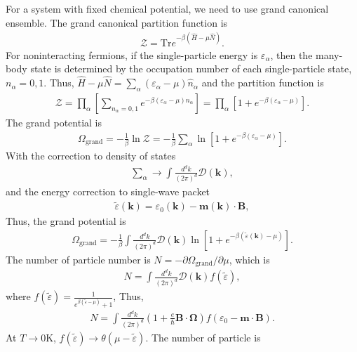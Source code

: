 \documentclass[12pt, oneside]{article}
\newcommand{\pa}{\partial}
\newcommand{\mr}[1]{\mathrm{#1}}
\newcommand{\p}[1]{\left(#1\right)}
\newcommand{\bb}[1]{\left[#1\right]}
\numberwithin{equation}{subsection}
\begin{document}
For a system with fixed chemical potential, we need to use grand canonical ensemble. The grand canonical partition function is 
\begin{align}
	\mathcal{Z} = \mr{Tr} e^{-\beta \p{\hat{H} - \mu \hat{N}}}.
\end{align}
For noninteracting fermions, if the single-particle energy is \(\varepsilon_\alpha\), then the many-body state is determined by the occupation number of each single-particle state, \(n_{\alpha} = 0,1\). Thus, \(\hat H-\mu \hat N = \sum_\alpha \p{\varepsilon_\alpha-\mu} \hat n_\alpha \) and the partition function is 
\begin{align}
	\mathcal Z = \prod_\alpha \left[ \sum_{n_\alpha=0,1} e^{-\beta(\varepsilon_\alpha-\mu)n_\alpha} \right] = \prod_{\alpha} \bb{1 + e^{-\beta \p{\varepsilon_{\alpha} - \mu}}}.
\end{align}
The grand potential is 
\begin{align}
	\Omega_\mr{grand} = - \frac{1}{\beta} \ln \mathcal{Z} =  - \frac{1}{\beta} \sum_{\alpha} \ln \bb{1 + e^{-\beta \p{\varepsilon_{\alpha} - \mu}}}.
\end{align}
With the correction to density of states 
\begin{align}
	\sum_{\alpha} \rightarrow \int \frac{d^d k}{\p{2 \pi}^{d}} \mathcal{D} \p{\bm{k}},
\end{align}
and the energy correction to single-wave packet
\begin{align}
	\tilde{\varepsilon} \p{\bm{k}} = \varepsilon_{0} \p{\bm{k} } - \bm{m} \p{\bm{k}} \cdot \bm{B},
\end{align}
Thus, the grand potential is 
\begin{align}
	\Omega_{\mr{grand}} =  -\frac{1}{\beta} \int \frac{d^d k}{\p{2 \pi}^{d}} \mathcal{D} \p{\bm{k}} \ln \left[ 1+ e^{-\beta(\tilde{\varepsilon}(\bm k)-\mu)} \right].
\end{align}
The number of particle number is \(N = - \pa \Omega_{\mr{grand}}/\pa \mu\), which is 
\begin{align}
	N = \int \frac{d^d k}{\p{2 \pi}^{d}} \mathcal{D}\p{\bm{k}}  f\p{\tilde{\varepsilon}},
\end{align}
where \(f \p{\tilde{\varepsilon}} = \frac{1}{e^{\beta \p{\tilde{\varepsilon}-\mu}}+1}\), Thus, 
\begin{align}
	N = \int \frac{d^d k}{\p{2 \pi}^{d}} \p{1+\frac{e}{\hbar}\bm B\cdot\bm\Omega} f \p{\varepsilon_0-\bm m\cdot\bm B}.
\end{align}
At \(T \rightarrow 0 \mr{K}\), \(f \p{\tilde{\varepsilon}} \rightarrow \theta \p{\mu - \tilde{\varepsilon}}\). The number of particle is 
\end{document}
